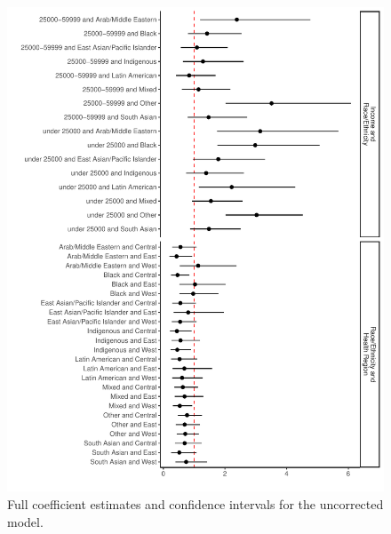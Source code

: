 \documentclass[
  letterpaper,
  DIV=11,
  numbers=noendperiod]{scrartcl}
\begin{document}
\begin{figure}

\includegraphics{appendix_files/figure-pdf/fig-model-uncorr-appendix-1.pdf} \hfill{}

\caption{\label{fig-model-uncorr-appendix}Full coefficient estimates and
confidence intervals for the uncorrected model.}

\end{figure}

\FloatBarrier
\end{document}
